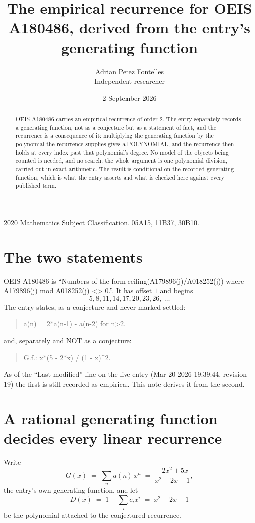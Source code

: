 \documentclass[11pt,a4paper]{article}
\title{The empirical recurrence for OEIS A180486, derived from the entry's generating function}
\author{Adrian Perez Fontelles\\ \small Independent researcher}
\date{2 September 2026}
\theoremstyle{plain}
\theoremstyle{definition}
\begin{document}
\maketitle

\begin{abstract}
OEIS A180486 carries an empirical recurrence of order $2$. The entry separately records a
generating function, not as a conjecture but as a statement of fact, and the recurrence is a
consequence of it: multiplying the generating function by the polynomial the recurrence
supplies gives a POLYNOMIAL, and the recurrence then holds at every index past that
polynomial's degree. No model of the objects being counted is needed, and no search: the
whole argument is one polynomial division, carried out in exact arithmetic. The result is
conditional on the recorded generating function, which is what the entry asserts and what is
checked here against every published term.
\end{abstract}

\noindent\small 2020 Mathematics Subject Classification. 05A15, 11B37, 30B10.\normalsize

\section{The two statements}

OEIS A180486 is ``Numbers of the form ceiling(A179896(j)/A018252(j)) where A179896(j) mod A018252(j) <> 0.''. It has offset $1$ and begins
\[
5, 8, 11, 14, 17, 20, 23, 26,\ \dots
\]
The entry states, as a conjecture and never marked settled:
\begin{quote}
a(n) = 2*a(n-1) - a(n-2) for n>2.
\end{quote}
and, separately and NOT as a conjecture:
\begin{quote}
G.f.: x*(5 - 2*x) / (1 - x)\^{}2.
\end{quote}
As of the ``Last modified'' line on the live entry (Mar 20 2026 19:39:44, revision 19) the first is still
recorded as empirical. This note derives it from the second.

\section{A rational generating function decides every linear recurrence}

Write
\[
G(x)\;=\;\sum_{n}a(n)\,x^{n}\;=\;\frac{- 2 x^{2} + 5 x}{x^{2} - 2 x + 1},
\]
the entry's own generating function, and let
\[
D(x)\;=\;1-\sum_i c_i x^{i}\;=\;x^{2} - 2 x + 1
\]
be the polynomial attached to the conjectured recurrence.
\end{document}

